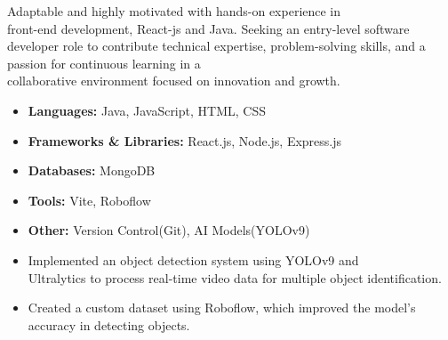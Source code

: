 \documentclass[10pt,a4paper,ragged2e,withhyper]{altacv}
\begin{document}
\begin{paracol}{2}

{ Adaptable and highly motivated with hands-on experience in \\ front-end development, React-js and Java. Seeking an entry-level software
 developer role to contribute technical expertise, problem-solving skills, and a passion for continuous learning in a \\collaborative environment focused on innovation and growth.}




\begin{itemize}
\item\small{\textbf{Languages:} Java, JavaScript, HTML, CSS }
\item\small{\textbf{Frameworks \& Libraries:} React.js, Node.js, Express.js}
\item\small{\textbf{Databases:} MongoDB}
\item\small{\textbf{Tools:} Vite, Roboflow }
\item\small{\textbf{Other:} Version Control(Git), AI Models(YOLOv9)}
\end{itemize}

\begin{itemize}
\item  Implemented an object detection system using YOLOv9 and \\Ultralytics to process real-time video data for multiple object identification.
\item  Created a custom dataset using Roboflow, which improved the model’s accuracy in detecting objects.
\end{itemize}




\end{paracol}
\end{document}
